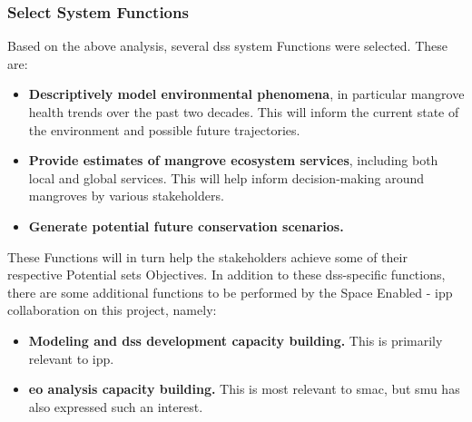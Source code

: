 %
%
%
%
%
%
%
%

\subsubsection{Select System Functions} \label{sec:rio-saf-function-result}

Based on the above analysis, several \ac{dss} system Functions were selected. These are:

\begin{itemize}[itemsep=0pt,parsep=0pt]
    \item{\textbf{Descriptively model environmental phenomena}, in particular mangrove health trends over the past two decades. This will inform the current state of the environment and possible future trajectories.}
    \item{\textbf{Provide estimates of mangrove ecosystem services}, including both local and global services. This will help inform decision-making around mangroves by various stakeholders.}
    \item{\textbf{Generate potential future conservation scenarios.}}
\end{itemize}

These Functions will in turn help the stakeholders achieve some of their respective Potential \ac{sets} Objectives. In addition to these \ac{dss}-specific functions, there are some additional functions to be performed by the Space Enabled - \ac{ipp} collaboration on this project, namely:

\begin{itemize}[itemsep=0pt,parsep=0pt]
    \item{\textbf{Modeling and \ac{dss} development capacity building.} This is primarily relevant to \ac{ipp}.}
    \item{\textbf{\ac{eo} analysis capacity building.} This is most relevant to \ac{smac}, but \ac{smu} has also expressed such an interest.}
\end{itemize}


